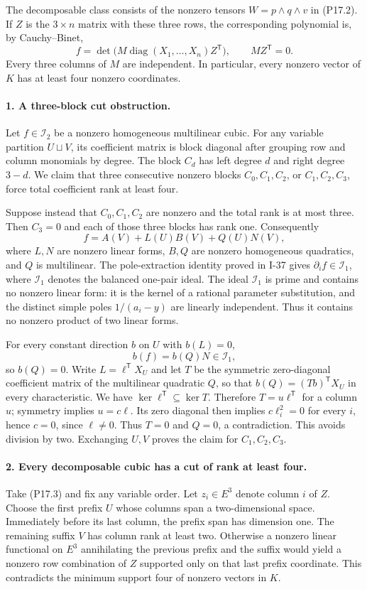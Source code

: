 The decomposable class consists of the nonzero tensors
$W=p\wedge q\wedge v$ in (P17.2). If $Z$ is the $3\times n$
matrix with these three rows, the corresponding polynomial is,
by Cauchy--Binet,
\[
 f=\det\bigl(M\operatorname{diag}(X_1,\ldots,X_n)Z^{\mathsf T}\bigr),
 \qquad MZ^{\mathsf T}=0.
 \tag{P17.3}
\]
Every three columns of $M$ are independent. In particular, every
nonzero vector of $K$ has at least four nonzero coordinates.

\paragraph{1. A three-block cut obstruction.}
Let $f\in\mathcal I_2$ be a nonzero homogeneous multilinear cubic.
For any variable partition $U\sqcup V$, its coefficient matrix is
block diagonal after grouping row and column monomials by degree.
The block $C_d$ has left degree $d$ and right degree $3-d$.
We claim that three consecutive nonzero blocks $C_0,C_1,C_2$, or
$C_1,C_2,C_3$, force total coefficient rank at least four.

Suppose instead that $C_0,C_1,C_2$ are nonzero and the total rank
is at most three. Then $C_3=0$ and each of those three blocks has
rank one. Consequently
\[
 f=A(V)+L(U)B(V)+Q(U)N(V),
 \tag{P17.4}
\]
where $L,N$ are nonzero linear forms, $B,Q$ are nonzero homogeneous
quadratics, and $Q$ is multilinear. The pole-extraction identity
proved in I-37 gives
$\partial_i f\in\mathcal I_1$, where $\mathcal I_1$ denotes the
balanced one-pair ideal. The ideal $\mathcal I_1$ is prime and
contains no nonzero linear form: it is the kernel of a rational
parameter substitution, and the distinct simple poles
$1/(a_i-y)$ are linearly independent. Thus it contains no
nonzero product of two linear forms.

For every constant direction $b$ on $U$ with $b(L)=0$,
\[
 b(f)=b(Q)N\in\mathcal I_1,
\]
so $b(Q)=0$. Write $L=\ell^{\mathsf T}X_U$ and let $T$ be the
symmetric zero-diagonal coefficient matrix of the multilinear
quadratic $Q$, so that $b(Q)=(Tb)^{\mathsf T}X_U$ in every
characteristic. We have $\ker\ell^{\mathsf T}\subseteq\ker T$.
Therefore $T=u\ell^{\mathsf T}$ for a column $u$; symmetry implies
$u=c\ell$. Its zero diagonal then implies $c\ell_i^2=0$ for every
$i$, hence $c=0$, since $\ell\ne0$. Thus $T=0$ and $Q=0$, a
contradiction. This avoids division by two. Exchanging $U,V$
proves the claim for $C_1,C_2,C_3$.

\paragraph{2. Every decomposable cubic has a cut of rank at least four.}
Take (P17.3) and fix any variable order. Let $z_i\in E^3$ denote
column $i$ of $Z$. Choose the first prefix $U$ whose columns span
a two-dimensional space. Immediately before its last column,
the prefix span has dimension one. The remaining suffix $V$
has column rank at least two. Otherwise a nonzero linear
functional on $E^3$ annihilating the previous prefix and the
suffix would yield a nonzero row combination of $Z$ supported
only on that last prefix coordinate. This contradicts the
minimum support four of nonzero vectors in $K$.

